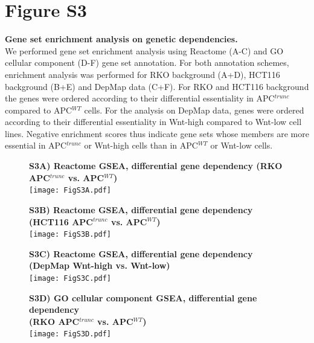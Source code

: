 \documentclass[11pt,a4paper,titlepage]{article}
\begin{document}
\clearpage

\pagebreak
\section*{Figure S3}
\textbf{Gene set enrichment analysis on genetic dependencies.}\\
We performed gene set enrichment analysis using Reactome (A-C) and GO cellular component (D-F) gene set annotation. For both annotation schemes, enrichment analysis was performed for RKO background (A+D), HCT116 background (B+E) and DepMap data (C+F). For RKO and HCT116 background the genes were ordered according to their differential essentiality in APC$^{trunc}$ compared to APC$^{WT}$ cells. For the analysis on DepMap data, genes were ordered according to their differential essentiality in Wnt-high compared to Wnt-low cell lines. Negative enrichment scores thus indicate gene sets whose members are more essential in APC$^{trunc}$ or Wnt-high cells than in APC$^{WT}$ or Wnt-low cells. \\

\begin{figure}[h!]
\textbf{S3A) Reactome GSEA, differential gene dependency (RKO APC$^{trunc}$ vs. APC$^{WT}$)}\\

\smallskip
\texttt{[image: FigS3A.pdf]} 
\end{figure}

\begin{figure}[h!]
\textbf{S3B) Reactome GSEA, differential gene dependency (HCT116 APC$^{trunc}$ vs. APC$^{WT}$)}\\

\smallskip
\texttt{[image: FigS3B.pdf]} 
\end{figure}

\begin{figure}[h!]
\textbf{S3C) Reactome GSEA, differential gene dependency (DepMap Wnt-high vs. Wnt-low)}\\

\smallskip
\texttt{[image: FigS3C.pdf]} 
\end{figure}

\begin{figure}[h!]
\textbf{S3D) GO cellular component GSEA, differential gene dependency\\(RKO APC$^{trunc}$ vs. APC$^{WT}$)}\\

\smallskip
\texttt{[image: FigS3D.pdf]} 
\end{figure}
\end{document}
